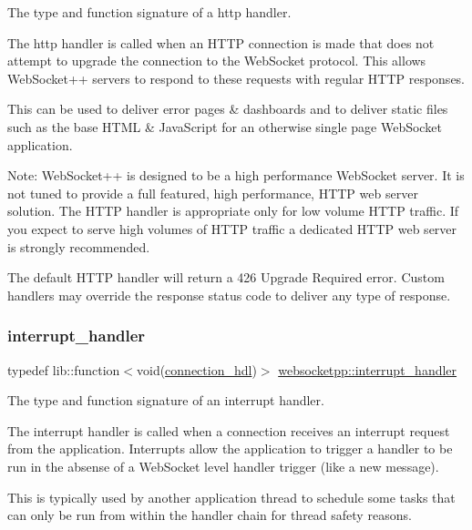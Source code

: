The type and function signature of a http handler. 

The http handler is called when an H\+T\+TP connection is made that does not attempt to upgrade the connection to the Web\+Socket protocol. This allows Web\+Socket++ servers to respond to these requests with regular H\+T\+TP responses.

This can be used to deliver error pages \& dashboards and to deliver static files such as the base H\+T\+ML \& Java\+Script for an otherwise single page Web\+Socket application.

Note\+: Web\+Socket++ is designed to be a high performance Web\+Socket server. It is not tuned to provide a full featured, high performance, H\+T\+TP web server solution. The H\+T\+TP handler is appropriate only for low volume H\+T\+TP traffic. If you expect to serve high volumes of H\+T\+TP traffic a dedicated H\+T\+TP web server is strongly recommended.

The default H\+T\+TP handler will return a 426 Upgrade Required error. Custom handlers may override the response status code to deliver any type of response. \mbox{\label{namespacewebsocketpp_a55f6947df7673a9de3c44b6bd5d4a82a}} 
\subsubsection{\texorpdfstring{interrupt\+\_\+handler}{interrupt\_handler}}
{\footnotesize\ttfamily typedef lib\+::function$<$void(\mbox{\hyperlink{namespacewebsocketpp_a6b3d26a10ee7229b84b776786332631d}{connection\+\_\+hdl}})$>$ \mbox{\hyperlink{namespacewebsocketpp_a55f6947df7673a9de3c44b6bd5d4a82a}{websocketpp\+::interrupt\+\_\+handler}}}



The type and function signature of an interrupt handler. 

The interrupt handler is called when a connection receives an interrupt request from the application. Interrupts allow the application to trigger a handler to be run in the absense of a Web\+Socket level handler trigger (like a new message).

This is typically used by another application thread to schedule some tasks that can only be run from within the handler chain for thread safety reasons. \mbox{\label{namespacewebsocketpp_a53c8b4ae59cf13b5f883b119bbd14d72}} 
